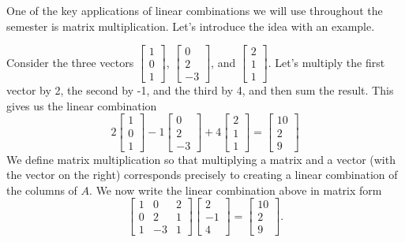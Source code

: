 One of the key applications of linear combinations we will use throughout the semester is matrix multiplication. Let's introduce the idea with an example.  
\begin{example}
Consider the three vectors 
$\begin{bmatrix}1\\0\\1\end{bmatrix}$,
$\begin{bmatrix}0\\2\\-3\end{bmatrix}$,
and 
$\begin{bmatrix}2\\1\\1\end{bmatrix}$.
Let's multiply the first vector by 2, the second by -1, and the third by 4, and then sum the result.  
This gives us the linear combination
$$2\begin{bmatrix}1\\0\\1\end{bmatrix}
-1\begin{bmatrix}0\\2\\-3\end{bmatrix}
+4\begin{bmatrix}2\\1\\1\end{bmatrix}
=
\begin{bmatrix}10\\2\\9\end{bmatrix} 
$$
We define matrix multiplication so that multiplying a matrix and a vector (with the vector on the right) corresponds precisely to creating a linear combination of the columns of $A$. 
We now write the linear combination above in matrix form 
$$ 
\begin{bmatrix}1&0&2\\0&2&1\\1&-3&1\end{bmatrix}
\begin{bmatrix}2\\-1\\4\end{bmatrix}
=
\begin{bmatrix}10\\2\\9\end{bmatrix} 
.$$
\end{example}

